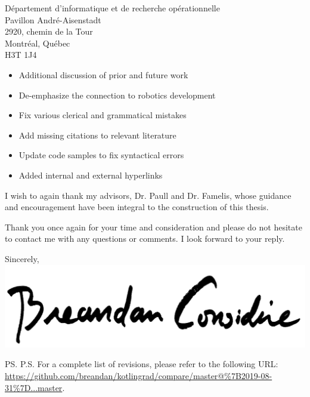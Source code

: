 \documentclass{letter}
\begin{document}
\begin{letter}{D\'epartement d'informatique et de recherche op\'erationnelle \\ Pavillon Andr\'e-Aisenstadt \\ 2920, chemin de la Tour \\ Montr\'eal, Qu\'ebec \\ H3T 1J4}
\begin{itemize}
                \begin{itemize}
                    \item Additional discussion of prior and future work
                    \item De-emphasize the connection to robotics development
                    \item Fix various clerical and grammatical mistakes
                    \item Add missing citations to relevant literature
                    \item Update code samples to fix syntactical errors
                    \item Added internal and external hyperlinks
                \end{itemize}
        \end{itemize}

        I wish to again thank my advisors, Dr. Paull and Dr. Famelis, whose guidance and encouragement have been integral to the construction of this thesis.

        Thank you once again for your time and consideration and please do not hesitate to contact me with any questions or comments. I look forward to your reply.

        \closing{Sincerely,\\
            \includegraphics[scale=0.06]{signature.png}\\
        }
        \ps{P.S. For a complete list of revisions, please refer to the following URL: \\
        {\footnotesize\url{https://github.com/breandan/kotlingrad/compare/master@\%7B2019-08-31\%7D...master}}.}
    \end{letter}
\end{document}
